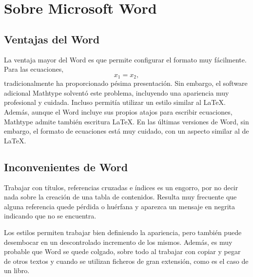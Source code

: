 \chapter{Sobre Microsoft Word\tsp{\textregistered}}

\section{Ventajas del Word\tsp{\textregistered}}
La ventaja mayor del Word\tsp{\textregistered} es que permite configurar el formato muy fácilmente. Para las ecuaciones,
\begin{equation}
x_{1}=x_{2},
\end{equation}
tradicionalmente ha proporcionado pésima presentación. Sin embargo, el software adicional Mathtype\tsp{\textregistered} solventó este problema, incluyendo una apariencia muy profesional y cuidada. Incluso permitía utilizar un estilo similar al \LaTeX\xspace. Además, aunque el Word\tsp{\textregistered} incluye sus propios atajos para escribir ecuaciones,  Mathtype\tsp{\textregistered} admite también escritura \LaTeX\xspace. En las últimas versiones de Word\tsp{\textregistered}, sin embargo, el formato de ecuaciones está muy cuidado, con un aspecto similar al de \LaTeX.


\section{Inconvenientes de Word\tsp{\textregistered}}
Trabajar con títulos, referencias cruzadas e índices es un engorro, por no decir nada sobre la creación de una tabla de contenidos. Resulta muy frecuente que alguna referencia quede pérdida o huérfana y aparezca un mensaje en negrita indicando que  no se encuentra. 

Los estilos permiten trabajar bien definiendo la apariencia, pero también puede desembocar en un descontrolado incremento de los mismos. Además, es muy probable que Word\tsp{\textregistered} se quede colgado, sobre todo al trabajar con copiar y pegar de otros textos y cuando se utilizan ficheros de gran extensión, como es el caso de un libro.

